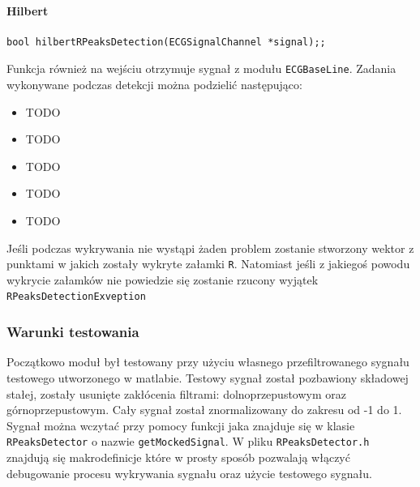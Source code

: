 \documentclass[a4paper, 11pt]{article}
\begin{document}
\paragraph{Hilbert}
\begin{lstlisting}
bool hilbertRPeaksDetection(ECGSignalChannel *signal);;
\end{lstlisting}
Funkcja również na wejściu otrzymuje sygnał z modułu \verb|ECGBaseLine|. Zadania wykonywane podczas detekcji można podzielić następująco:
\begin{itemize}
	\item TODO
	\item TODO
	\item TODO
	\item TODO
	\item TODO
\end{itemize}
Jeśli podczas wykrywania nie wystąpi żaden problem zostanie stworzony wektor z punktami w jakich zostały wykryte załamki \verb|R|. Natomiast jeśli z jakiegoś powodu wykrycie załamków nie powiedzie się zostanie rzucony wyjątek \verb|RPeaksDetectionExveption|

\subsubsection{Warunki testowania}
\label{sec:rs:tests}
Początkowo moduł był testowany przy użyciu własnego przefiltrowanego sygnału testowego utworzonego w matlabie. Testowy sygnał został pozbawiony składowej stałej, zostały usunięte zakłócenia filtrami: dolnoprzepustowym oraz górnoprzepustowym. Cały sygnał został znormalizowany do zakresu od -1 do 1.\\
\indent Sygnał można wczytać przy pomocy funkcji jaka znajduje się w klasie \verb|RPeaksDetector| o nazwie \verb|getMockedSignal|. W pliku \verb|RPeaksDetector.h| znajdują się makrodefinicje które w prosty sposób pozwalają włączyć debugowanie procesu wykrywania sygnału oraz użycie testowego sygnału.\\
\end{document}
